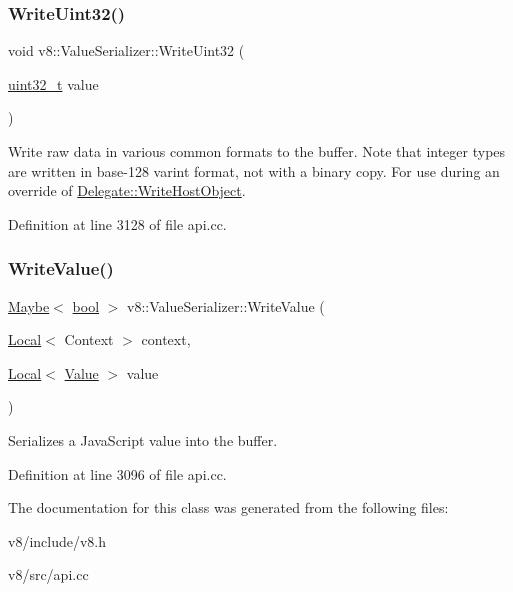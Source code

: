 \mbox{\label{classv8_1_1ValueSerializer_a8345af97eb58727384cab6a2738924d1}} 
\subsubsection{\texorpdfstring{Write\+Uint32()}{WriteUint32()}}
{\footnotesize\ttfamily void v8\+::\+Value\+Serializer\+::\+Write\+Uint32 (\begin{DoxyParamCaption}\item[{\mbox{\hyperlink{classuint32__t}{uint32\+\_\+t}}}]{value }\end{DoxyParamCaption})}

Write raw data in various common formats to the buffer. Note that integer types are written in base-\/128 varint format, not with a binary copy. For use during an override of \mbox{\hyperlink{classv8_1_1ValueSerializer_1_1Delegate_a9cdf9bb45300507456548161cbe656b5}{Delegate\+::\+Write\+Host\+Object}}. 

Definition at line 3128 of file api.\+cc.

\mbox{\label{classv8_1_1ValueSerializer_abaaf71649f106af23c1c43f12e6a8394}} 
\subsubsection{\texorpdfstring{Write\+Value()}{WriteValue()}}
{\footnotesize\ttfamily \mbox{\hyperlink{classv8_1_1Maybe}{Maybe}}$<$ \mbox{\hyperlink{classbool}{bool}} $>$ v8\+::\+Value\+Serializer\+::\+Write\+Value (\begin{DoxyParamCaption}\item[{\mbox{\hyperlink{classv8_1_1Local}{Local}}$<$ Context $>$}]{context,  }\item[{\mbox{\hyperlink{classv8_1_1Local}{Local}}$<$ \mbox{\hyperlink{classv8_1_1Value}{Value}} $>$}]{value }\end{DoxyParamCaption})}

Serializes a Java\+Script value into the buffer. 

Definition at line 3096 of file api.\+cc.



The documentation for this class was generated from the following files\+:\begin{DoxyCompactItemize}
\item 
v8/include/v8.\+h\item 
v8/src/api.\+cc\end{DoxyCompactItemize}
